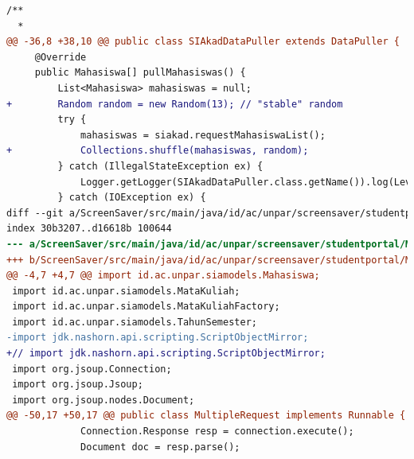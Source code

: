\begin{lstlisting}[language=diff, caption=Perbedaan kode dosen dengan mahasiswa, label=diff_dosen_mahasiswa]
 /**
  *
@@ -36,8 +38,10 @@ public class SIAkadDataPuller extends DataPuller {
     @Override
     public Mahasiswa[] pullMahasiswas() {
         List<Mahasiswa> mahasiswas = null;
+        Random random = new Random(13); // "stable" random
         try {
             mahasiswas = siakad.requestMahasiswaList();
+            Collections.shuffle(mahasiswas, random);
         } catch (IllegalStateException ex) {
             Logger.getLogger(SIAkadDataPuller.class.getName()).log(Level.SEVERE, null, ex);
         } catch (IOException ex) {
diff --git a/ScreenSaver/src/main/java/id/ac/unpar/screensaver/studentportal/MultipleRequest.java b/ScreenSaver/src/main/java/id/ac/unpar/screensaver/studentportal/MultipleRequest.java
index 30b3207..d16618b 100644
--- a/ScreenSaver/src/main/java/id/ac/unpar/screensaver/studentportal/MultipleRequest.java
+++ b/ScreenSaver/src/main/java/id/ac/unpar/screensaver/studentportal/MultipleRequest.java
@@ -4,7 +4,7 @@ import id.ac.unpar.siamodels.Mahasiswa;
 import id.ac.unpar.siamodels.MataKuliah;
 import id.ac.unpar.siamodels.MataKuliahFactory;
 import id.ac.unpar.siamodels.TahunSemester;
-import jdk.nashorn.api.scripting.ScriptObjectMirror;
+// import jdk.nashorn.api.scripting.ScriptObjectMirror;
 import org.jsoup.Connection;
 import org.jsoup.Jsoup;
 import org.jsoup.nodes.Document;
@@ -50,17 +50,17 @@ public class MultipleRequest implements Runnable {
             Connection.Response resp = connection.execute();
             Document doc = resp.parse();
 

\end{lstlisting}
